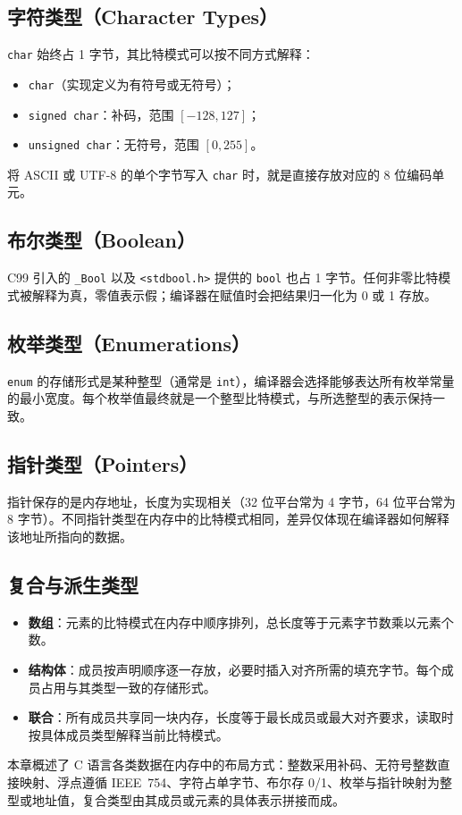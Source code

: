 \subsection{字符类型（Character Types）}

\texttt{char} 始终占 1 字节，其比特模式可以按不同方式解释：
\begin{itemize}
  \item \texttt{char}（实现定义为有符号或无符号）；
  \item \texttt{signed char}：补码，范围 $[-128,127]$；
  \item \texttt{unsigned char}：无符号，范围 $[0,255]$。
\end{itemize}
将 ASCII 或 UTF-8 的单个字节写入 \texttt{char} 时，就是直接存放对应的 8 位编码单元。

\subsection{布尔类型（Boolean）}

C99 引入的 \texttt{\_Bool} 以及 \texttt{<stdbool.h>} 提供的 \texttt{bool} 也占 1 字节。任何非零比特模式被解释为真，零值表示假；编译器在赋值时会把结果归一化为 0 或 1 存放。

\subsection{枚举类型（Enumerations）}

\texttt{enum} 的存储形式是某种整型（通常是 \texttt{int}），编译器会选择能够表达所有枚举常量的最小宽度。每个枚举值最终就是一个整型比特模式，与所选整型的表示保持一致。

\subsection{指针类型（Pointers）}

指针保存的是内存地址，长度为实现相关（32 位平台常为 4 字节，64 位平台常为 8 字节）。不同指针类型在内存中的比特模式相同，差异仅体现在编译器如何解释该地址所指向的数据。

\subsection{复合与派生类型}

\begin{itemize}
  \item \textbf{数组}：元素的比特模式在内存中顺序排列，总长度等于元素字节数乘以元素个数。
  \item \textbf{结构体}：成员按声明顺序逐一存放，必要时插入对齐所需的填充字节。每个成员占用与其类型一致的存储形式。
  \item \textbf{联合}：所有成员共享同一块内存，长度等于最长成员或最大对齐要求，读取时按具体成员类型解释当前比特模式。
\end{itemize}

本章概述了 C 语言各类数据在内存中的布局方式：整数采用补码、无符号整数直接映射、浮点遵循 IEEE~754、字符占单字节、布尔存 0/1、枚举与指针映射为整型或地址值，复合类型由其成员或元素的具体表示拼接而成。

